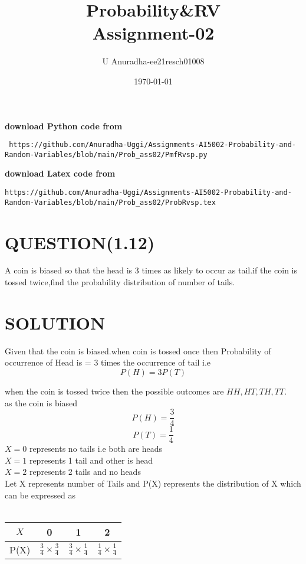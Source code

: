 \documentclass[journal,12pt,twocolumn]{IEEEtran}
\title{Probability\&RV \\ Assignment-02}
\author{U Anuradha-ee21resch01008}
\date{\today}
\begin{document}
\maketitle
\newpage
\bigskip
\renewcommand{\thefigure}{\theenumi}
\renewcommand{\thetable}{\theenumi}
\textbf{download Python code from}
\begin{lstlisting}
 https://github.com/Anuradha-Uggi/Assignments-AI5002-Probability-and-Random-Variables/blob/main/Prob_ass02/PmfRvsp.py
\end{lstlisting}
\textbf{download Latex code from}
\begin{lstlisting}
https://github.com/Anuradha-Uggi/Assignments-AI5002-Probability-and-Random-Variables/blob/main/Prob_ass02/ProbRvsp.tex
\end{lstlisting}
\section{QUESTION(1.12)}
A coin is biased so that the head is 3 times as likely to occur as tail.if the coin is tossed twice,find the probability distribution of number of tails. \\
\section{SOLUTION}
Given that the coin is biased.when coin is tossed once then
Probability of occurrence of Head is = 3 times the occurrence of tail i.e
\begin{equation}
    P(H)=3 P(T)
\end{equation}

when the coin is tossed twice then the possible outcomes are   $HH,HT,TH,TT$.\\
as the coin is biased 
\begin{equation*}
    P(H)=\frac{3}{4} 
\end{equation*}
\begin{equation*}
    P(T)=\frac{1}{4}
\end{equation*}
$X=0$ represents no tails i.e both are heads\\
$X=1$ represents 1 tail and other is head\\
$X=2$ represents 2 tails and no heads\\

Let X represents number of Tails and P(X) represents the distribution of  X which can be expressed as\\ \\
\begin{tabular}{|c|c|c|c|}
\hline
   $X$  & 0 & 1 & 2 \\
\hline
  P(X) & $\frac{3}{4}\times \frac{3}{4}$ &$\frac{3}{4}\times \frac{1}{4}$ & $ \frac{1}{4}\times \frac{1}{4}$ \\
  \hline
\end{tabular}\\
\newline
\end{document}
